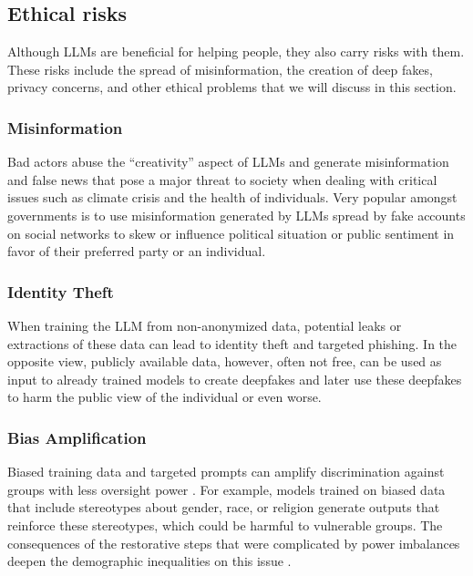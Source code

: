 \subsection{Ethical risks}
Although LLMs are beneficial for helping people, they also carry risks with them. These risks include the spread of misinformation, the creation of deep fakes, privacy concerns, and other ethical problems that we will discuss in this section.

\subsubsection*{Misinformation}

Bad actors abuse the ``creativity'' aspect of LLMs and generate misinformation and false news that pose a major threat to society when dealing with critical issues such as climate crisis and the health of individuals. Very popular amongst governments is to use misinformation generated by LLMs spread by fake accounts on social networks to skew or influence political situation or public sentiment in favor of their preferred party or an individual.

\subsubsection*{Identity Theft}

When training the LLM from non-anonymized data, potential leaks or extractions of these data can lead to identity theft and targeted phishing. 
In the opposite view, publicly available data, however, often not free, can be used as input to already trained models to create deepfakes and later use these deepfakes to harm the public view of the individual or even worse.

\subsubsection*{Bias Amplification}

Biased training data and targeted prompts can amplify discrimination against groups with less oversight power \cite{kumar2024ethicsinteractionmitigatingsecurity}. For example, models trained on biased data that include stereotypes about gender, race, or religion generate outputs that reinforce these stereotypes, which could be harmful to vulnerable groups. The consequences of the restorative steps that were complicated by power imbalances deepen the demographic inequalities on this issue \cite{kumar2024ethicsinteractionmitigatingsecurity}.

